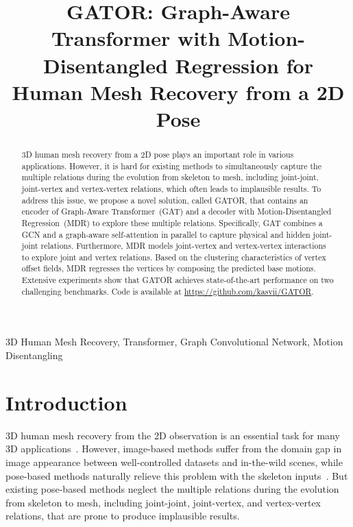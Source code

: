 \documentclass{article}
\title{GATOR: Graph-Aware Transformer with Motion-Disentangled Regression for Human Mesh Recovery from a 2D Pose}
\begin{document}
\maketitle

\begin{abstract}
3D human mesh recovery from a 2D pose plays an important role in various applications.
However, it is hard for existing methods to simultaneously capture the multiple relations during the evolution from skeleton to mesh, including joint-joint, joint-vertex and vertex-vertex relations, which often leads to implausible results.
To address this issue, we propose a novel solution, called GATOR, that contains an encoder of Graph-Aware Transformer~(GAT) and a decoder with Motion-Disentangled Regression~(MDR) to explore these multiple relations. 
Specifically, GAT combines a GCN and a graph-aware self-attention in parallel to capture physical and hidden joint-joint relations. 
Furthermore, MDR models joint-vertex and vertex-vertex interactions to explore joint and vertex relations. Based on the clustering characteristics of vertex offset fields, MDR regresses the vertices by composing the predicted base motions. 
Extensive experiments show that GATOR achieves state-of-the-art performance on two challenging benchmarks. 
Code is available at \href{https://github.com/kasvii/GATOR}{https://github.com/kasvii/GATOR}.
\end{abstract}

\vspace{-0.10cm}
\begin{keywords}
3D Human Mesh Recovery, Transformer, Graph Convolutional Network, Motion Disentangling
\end{keywords}

\vspace{-2.0mm}
\section{Introduction}
\vspace{-2.0mm}

\label{sec:intro}


3D human mesh recovery from the 2D observation is an essential task for many 3D applications~\cite{survey}.
However, image-based methods suffer from the domain gap in image appearance between well-controlled datasets and in-the-wild scenes,
while pose-based methods naturally relieve this problem with the skeleton inputs~\cite{choi2020pose2mesh, pqgcn, zheng2021lightweight, mug}. 
But existing pose-based methods neglect the multiple relations during the evolution from skeleton to mesh, including joint-joint, joint-vertex, and vertex-vertex relations, that are prone to produce implausible results.
\end{document}
